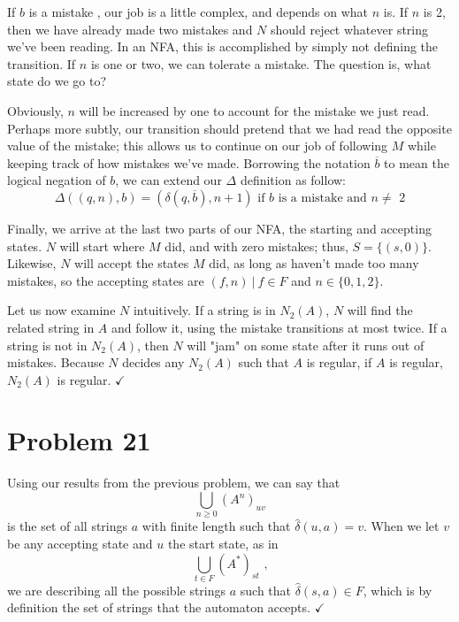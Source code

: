 \documentclass[11pt]{article}
\begin{document}
If $b$ is a mistake , our job is a little complex, and depends on what $n$ is. If $n$ is 2, then we have already made two mistakes and $N$ should reject whatever string we've been reading. In an NFA, this is accomplished by simply not defining the transition. If $n$ is one or two, we can tolerate a mistake. The question is, what state do we go to? 

Obviously, $n$ will be increased by one to account for the mistake we just read. Perhaps more subtly, our transition should pretend that we had read the opposite value of the mistake; this allows us to continue on our job of following $M$ while keeping track of how mistakes we've made. Borrowing the notation $\overline{b}$ to mean the logical negation of $b$, we can extend our $\Delta$ definition as follow:
	\[ \Delta( (q, n), b) = (\delta(q, \overline{b}), n+1) \text{ if $b$ is a mistake and $n \neq$ 2}\]
	
Finally, we arrive at the last two parts of our NFA, the starting and accepting states. $N$ will start where $M$ did, and with zero mistakes; thus, $S = \{ (s, 0) \}$. Likewise, $N$ will accept the states $M$ did, as long as haven't made too many mistakes, so the accepting states are $(f, n )\ |\ f \in F $ and $ n \in \{0, 1, 2\}$.

Let us now examine $N$ intuitively. If a string is in $N_2(A)$, $N$ will find the related string in $A$ and follow it, using the mistake transitions at most twice. If a string is not in $N_2(A)$, then $N$ will "jam" on some state after it runs out of mistakes. Because $N$ decides any $N_2(A)$ such that $A$ is regular, if $A$ is regular, $N_2(A)$ is regular. $\checkmark$


\section*{Problem 21}
Using our results from the previous problem, we can say that
	\[ \bigcup _{n \geq 0} (A^n)_{uv} \]
is the set of all strings $a$ with finite length such that $\hat{\delta}(u, a) = v $. When we let $v$ be any accepting state and $u$ the start state, as in 
	\[ \bigcup _{t \in F} (A^*)_{st} \text{ ,} \]
we are describing all the possible strings $a$ such that $\hat{ \delta }(s, a) \in F$, which is by definition the set of strings that the automaton accepts. $\checkmark$
\end{document}
